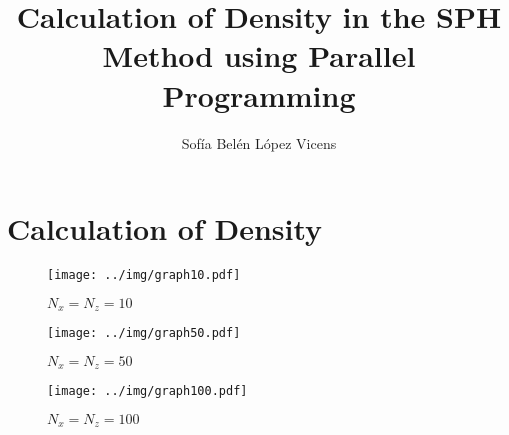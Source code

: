 \documentclass[a4paper,12pt]{article}
\author{Sof\'ia Bel\'en L\'opez Vicens}
\title{Calculation of Density in the SPH Method using Parallel Programming}
\begin{document}
\maketitle
\section{Calculation of Density}

\begin{figure}[H]
    \centering
    \texttt{[image: ../img/graph10.pdf]}
    \caption{$N_x = N_z = 10$}
\end{figure}

\begin{figure}[H]
    \centering
    \texttt{[image: ../img/graph50.pdf]}
    \caption{$N_x = N_z = 50$}
\end{figure}

\begin{figure}[H]
    \centering
    \texttt{[image: ../img/graph100.pdf]}
    \caption{$N_x = N_z = 100$}
\end{figure}
    
\end{document}

